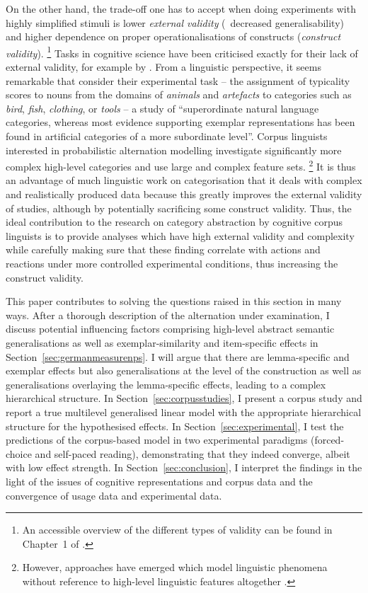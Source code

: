 On the other hand, the trade-off one has to accept when doing experiments with highly simplified stimuli is lower \textit{external validity} (\ie\ decreased generalisability) and higher dependence on proper operationalisations of constructs (\textit{construct validity}).%
\footnote{An accessible overview of the different types of validity can be found in Chapter~1 of \citet{MaxwellDelaney2004}.}
Tasks in cognitive science have been criticised exactly for their lack of external validity, for example by \citet{Murphy2003}.
From a linguistic perspective, it seems remarkable that \citet[1013]{VoorspoelsEa2011} consider their experimental task -- the assignment of typicality scores to nouns from the domains of \textit{animals} and \textit{artefacts} to categories such as \textit{bird}, \textit{fish}, \textit{clothing}, or \textit{tools} -- a study of ``superordinate natural language categories, whereas most evidence supporting exemplar representations has been found in artificial categories of a more subordinate level''.
Corpus linguists interested in probabilistic alternation modelling investigate significantly more complex high-level categories and use large and complex feature sets.%
\footnote{However, approaches have emerged which model linguistic phenomena without reference to high-level linguistic features altogether \citep{BaayenEa2016,RamscarPort2016}.}
It is thus an advantage of much linguistic work on categorisation that it deals with complex and realistically produced data because this greatly improves the external validity of studies, although by potentially sacrificing some construct validity.
Thus, the ideal contribution to the research on category abstraction by cognitive corpus linguists is to provide analyses which have high external validity and complexity while carefully making sure that these finding correlate with actions and reactions under more controlled experimental conditions, thus increasing the construct validity.

This paper contributes to solving the questions raised in this section in many ways.
After a thorough description of the alternation under examination, I discuss potential influencing factors comprising high-level abstract semantic generalisations as well as exemplar-similarity and item-specific effects in Section~\ref{sec:germanmeasurenps}.
I will argue that there are lemma-specific and exemplar effects but also generalisations at the level of the construction as well as generalisations overlaying the lemma-specific effects, leading to a complex hierarchical structure.
In Section~\ref{sec:corpusstudies}, I present a corpus study and report a true multilevel generalised linear model with the appropriate hierarchical structure for the hypothesised effects.
In Section~\ref{sec:experimental}, I test the predictions of the corpus-based model in two experimental paradigms (forced-choice and self-paced reading), demonstrating that they indeed converge, albeit with low effect strength.
In Section~\ref{sec:conclusion}, I interpret the findings in the light of the issues of cognitive representations and corpus data and the convergence of usage data and experimental data.

